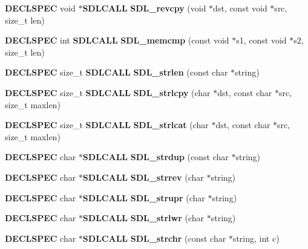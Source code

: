 \begin{DoxyCompactItemize}
\item 
{\bf D\+E\+C\+L\+S\+P\+E\+C} void $\ast${\bf S\+D\+L\+C\+A\+L\+L} {\bfseries S\+D\+L\+\_\+revcpy} (void $\ast$dst, const void $\ast$src, size\+\_\+t len)\label{_s_d_l__stdinc_8h_ae22fc5d318ac539ebd31edb6f5b2fadf}

\item 
{\bf D\+E\+C\+L\+S\+P\+E\+C} int {\bf S\+D\+L\+C\+A\+L\+L} {\bfseries S\+D\+L\+\_\+memcmp} (const void $\ast$s1, const void $\ast$s2, size\+\_\+t len)\label{_s_d_l__stdinc_8h_af8e26df545c29284291714410fa7731e}

\item 
{\bf D\+E\+C\+L\+S\+P\+E\+C} size\+\_\+t {\bf S\+D\+L\+C\+A\+L\+L} {\bfseries S\+D\+L\+\_\+strlen} (const char $\ast$string)\label{_s_d_l__stdinc_8h_a16371ac8bea95cfb560cace79a6c8a15}

\item 
{\bf D\+E\+C\+L\+S\+P\+E\+C} size\+\_\+t {\bf S\+D\+L\+C\+A\+L\+L} {\bfseries S\+D\+L\+\_\+strlcpy} (char $\ast$dst, const char $\ast$src, size\+\_\+t maxlen)\label{_s_d_l__stdinc_8h_a7ab3cb24c12ac73d6f8422d6ad667f8e}

\item 
{\bf D\+E\+C\+L\+S\+P\+E\+C} size\+\_\+t {\bf S\+D\+L\+C\+A\+L\+L} {\bfseries S\+D\+L\+\_\+strlcat} (char $\ast$dst, const char $\ast$src, size\+\_\+t maxlen)\label{_s_d_l__stdinc_8h_a67a95e15b395973cc9aaf93033bd484a}

\item 
{\bf D\+E\+C\+L\+S\+P\+E\+C} char $\ast${\bf S\+D\+L\+C\+A\+L\+L} {\bfseries S\+D\+L\+\_\+strdup} (const char $\ast$string)\label{_s_d_l__stdinc_8h_a3e3ca7ebc4fd013c3801adbdde12496e}

\item 
{\bf D\+E\+C\+L\+S\+P\+E\+C} char $\ast${\bf S\+D\+L\+C\+A\+L\+L} {\bfseries S\+D\+L\+\_\+strrev} (char $\ast$string)\label{_s_d_l__stdinc_8h_a96c0d56ecc7828f47a2833f61bcd98b1}

\item 
{\bf D\+E\+C\+L\+S\+P\+E\+C} char $\ast${\bf S\+D\+L\+C\+A\+L\+L} {\bfseries S\+D\+L\+\_\+strupr} (char $\ast$string)\label{_s_d_l__stdinc_8h_a07b7dc927252e252a1c8e5d0ff5e25e1}

\item 
{\bf D\+E\+C\+L\+S\+P\+E\+C} char $\ast${\bf S\+D\+L\+C\+A\+L\+L} {\bfseries S\+D\+L\+\_\+strlwr} (char $\ast$string)\label{_s_d_l__stdinc_8h_afd7f2175282b0884b5d4e412ebac0dca}

\item 
{\bf D\+E\+C\+L\+S\+P\+E\+C} char $\ast${\bf S\+D\+L\+C\+A\+L\+L} {\bfseries S\+D\+L\+\_\+strchr} (const char $\ast$string, int c)\label{_s_d_l__stdinc_8h_a04404b18bf3d34f7c5f37ddef2d647dc}


\end{DoxyCompactItemize}
